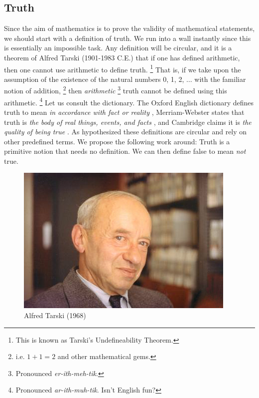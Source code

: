     \subsection{Truth}
        Since the aim of mathematics is to prove the validity of mathematical
        statements, we should start with a definition of truth. We run into a
        wall instantly since this is essentially an impossible task. Any
        definition will be circular, and it is a theorem of
        Alfred Tarski (1901-1983 C.E.) that if one has
        defined arithmetic, then one cannot use arithmetic to define
        truth.%
        \footnote{%
            This is known as Tarski's Undefineability Theorem.%
        }
        That is, if we take upon the assumption of the existence of the
        natural numbers 0, 1, 2, $\dots$ with the familiar notion of addition,%
        \footnote{%
            i.e. $1+1=2$ and other mathematical gems.
        }
        then \textit{arithmetic}%
        \footnote{%
            Pronounced \textit{er-ith-meh-tik}.
        }
        truth cannot be defined using this arithmetic.%
        \footnote{%
            Pronounced \textit{ar-ith-muh-tik}. Isn't English fun?
        }
        Let us consult the dictionary. The Oxford English dictionary defines
        truth to mean \textit{in accordance with fact or reality}
        \cite{OEDTrueDef}, Merriam-Webster states that truth is
        \textit{the body of real things, events, and facts}
        \cite{MerriamWebsterTruthDef}, and Cambridge claims it is
        \textit{the quality of being true} \cite{CambridgeTruthDef}. As
        hypothesized these definitions are circular and rely on other predefined
        terms. We propose the following work around: Truth is a
        primitive notion that needs no definition. We can then define
        false to mean \textit{not} true.
        \begin{figure}[H]
            \centering
            \captionsetup{type=figure}
            \if{}
                \includegraphics[scale=0.4]{photos/AlfredTarski1968.jpeg}
            \fi
            \caption{Alfred Tarski (1968)}
            \label{photo:Alfred_Tarski}
        \end{figure}
